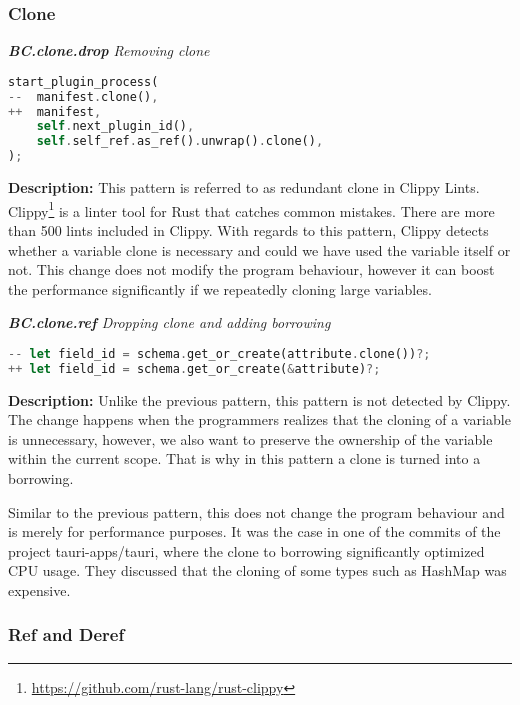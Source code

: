 \subsubsection{Clone}

\noindent\textit{\textbf{BC.clone.drop} Removing clone}

\begin{lstlisting}[language=Rust, style=colouredRust]
start_plugin_process(
--  manifest.clone(),
++  manifest,
    self.next_plugin_id(),
    self.self_ref.as_ref().unwrap().clone(),
);
\end{lstlisting}

\noindent\textbf{Description:} This pattern is referred to as redundant clone in Clippy Lints. Clippy\footnote{\url{https://github.com/rust-lang/rust-clippy}} is a linter tool for Rust that catches common mistakes. There are more than 500 lints included in Clippy. With regards to this pattern, Clippy detects whether a variable clone is necessary and could we have used the variable itself or not. This change does not modify the program behaviour, however it can boost the performance significantly if we repeatedly cloning large variables. 

\noindent\textit{\textbf{BC.clone.ref} Dropping clone and adding borrowing}

\begin{lstlisting}[language=Rust, style=colouredRust]
-- let field_id = schema.get_or_create(attribute.clone())?;
++ let field_id = schema.get_or_create(&attribute)?;
\end{lstlisting}

\noindent\textbf{Description:} Unlike the previous pattern, this pattern is not detected by Clippy. The change happens when the programmers realizes that the cloning of a variable is unnecessary, however, we also want to preserve the ownership of the variable within the current scope. That is why in this pattern a clone is turned into a borrowing. 

Similar to the previous pattern, this does not change the program behaviour and is merely for performance purposes. It was the case in one of the commits of the project tauri-apps/tauri, where the clone to borrowing significantly optimized CPU usage. They discussed that the cloning of some types such as HashMap was expensive. \\

\subsubsection{Ref and Deref}

